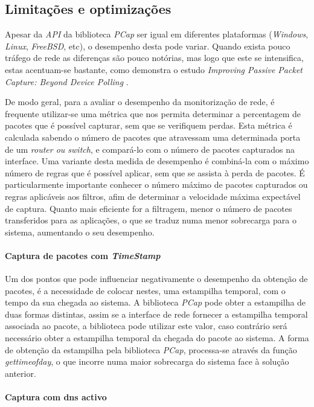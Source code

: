 \subsection{Limitações e optimizações}
Apesar da \textit{API} da biblioteca \textit{PCap} ser igual em diferentes plataformas (\textit{Windows}, \textit{Linux}, \textit{FreeBSD}, etc), o desempenho desta pode variar.
Quando exista pouco tráfego de rede as diferenças são pouco notórias, mas logo que este se intensifica, estas acentuam-se bastante, como demonstra o estudo \textit{Improving Passive Packet Capture: Beyond Device Polling} \cite{Deri2004}.

De modo geral, para a avaliar o desempenho da monitorização de rede, é frequente utilizar-se uma métrica que nos permita determinar a percentagem de pacotes que é possível capturar, sem que se verifiquem perdas.
Esta métrica é calculada sabendo o número de pacotes que atravessam uma determinada porta de um \textit{router ou switch}, e compará-lo com o número de pacotes capturados na interface.
Uma variante desta medida de desempenho é combiná-la com o máximo número de regras que é possível aplicar, sem que se assista à perda de pacotes.
É particularmente importante conhecer o número máximo de pacotes capturados ou regras aplicáveis aos filtros, afim de determinar a velocidade máxima expectável de captura.
Quanto mais eficiente for a filtragem, menor o número de pacotes transferidos para as aplicações, o que se traduz numa menor sobrecarga para o sistema, aumentando o seu desempenho.

\paragraph{Captura de pacotes com \textit{TimeStamp}}
Um dos pontos que pode influenciar negativamente o desempenho da obtenção de pacotes, é a necessidade de colocar nestes, uma estampilha temporal, com o tempo da sua chegada ao sistema.
A biblioteca \textit{PCap} pode obter a estampilha de duas formas distintas, assim se a interface de rede fornecer a estampilha temporal associada ao pacote, a biblioteca pode utilizar este valor, caso contrário será necessário obter a estampilha temporal da chegada do pacote ao sistema.
A forma de obtenção da estampilha pela biblioteca \textit{PCap}, processa-se através da função \textit{gettimeofday}, o que incorre numa maior sobrecarga do sistema face à solução anterior.

\paragraph{Captura com dns activo}

